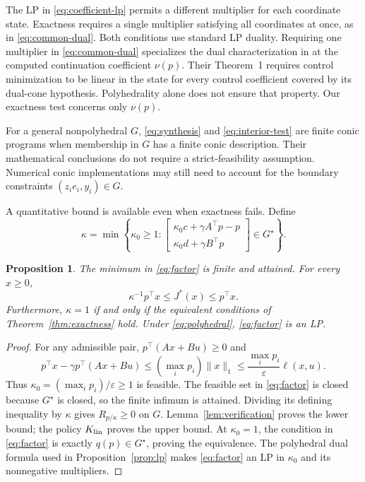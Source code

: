 \documentclass[10pt]{article}
\newtheorem{proposition}{Proposition}
\begin{document}
The LP in \eqref{eq:coefficient-lp} permits a different multiplier for each coordinate state. Exactness requires a single multiplier satisfying all coordinates at once, as in \eqref{eq:common-dual}. Both conditions use standard LP duality. Requiring one multiplier in \eqref{eq:common-dual} specializes the dual characterization in \cite[Theorem~2]{pates-rantzer} at the computed continuation coefficient $\nu(p)$. Their Theorem~1 requires control minimization to be linear in the state for every control coefficient covered by its dual-cone hypothesis. Polyhedrality alone does not ensure that property. Our exactness test concerns only $\nu(p)$.

For a general nonpolyhedral $G$, \eqref{eq:synthesis} and \eqref{eq:interior-test} are finite conic programs when membership in $G$ has a finite conic description. Their mathematical conclusions do not require a strict-feasibility assumption. Numerical conic implementations may still need to account for the boundary constraints $(z_i e_i,y_i)\in G$.

A quantitative bound is available even when exactness fails. Define
\begin{equation}
 \kappa=\min\left\{\kappa_0\ge1:
 \begin{bmatrix}\kappa_0 c+\gamma A^\top p-p\\\kappa_0 d+\gamma B^\top p\end{bmatrix}
 \in G^\star\right\}.
 \label{eq:factor}
\end{equation}

\begin{proposition}
\label{prop:factor}
The minimum in \eqref{eq:factor} is finite and attained. For every $x\ge0$,
\begin{equation}
 \kappa^{-1}p^\top x\le J^*(x)\le p^\top x.
 \label{eq:factor-bound}
\end{equation}
Furthermore, $\kappa=1$ if and only if the equivalent conditions of Theorem~\ref{thm:exactness} hold. Under \eqref{eq:polyhedral}, \eqref{eq:factor} is an LP.
\end{proposition}
\begin{proof}
For any admissible pair, $p^\top(Ax+Bu)\ge0$ and
\[
 p^\top x-\gamma p^\top(Ax+Bu)
 \le(\max_i p_i)\|x\|_1
 \le\frac{\max_i p_i}{\varepsilon}\ell(x,u).
\]
Thus $\kappa_0=(\max_i p_i)/\varepsilon\ge1$ is feasible. The feasible set in \eqref{eq:factor} is closed because $G^\star$ is closed, so the finite infimum is attained. Dividing its defining inequality by $\kappa$ gives $R_{p/\kappa}\ge0$ on $G$. Lemma~\ref{lem:verification} proves the lower bound; the policy $K_{\rm lin}$ proves the upper bound. At $\kappa_0=1$, the condition in \eqref{eq:factor} is exactly $q(p)\in G^\star$, proving the equivalence. The polyhedral dual formula used in Proposition~\ref{prop:lp} makes \eqref{eq:factor} an LP in $\kappa_0$ and its nonnegative multipliers.
\end{proof}
\end{document}
